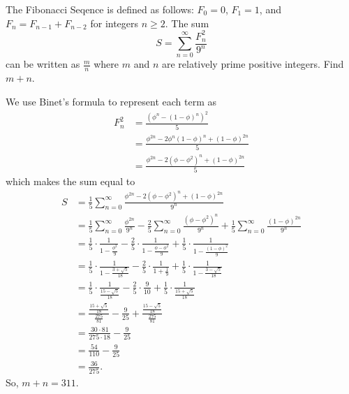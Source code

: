 \documentclass[11pt]{scrartcl}
\begin{document}
\begin{problem}
    The Fibonacci Seqence is defined as follows: $F_{0} = 0$, $F_{1} = 1$, and $F_{n} = F_{n - 1} + F_{n - 2}$ for integers $n \geq 2$. The sum
    \[S = \sum_{n = 0}^{\infty} \frac{F_{n}^{2}}{9^{n}}\]
    can be written as $\frac{m}{n}$ where $m$ and $n$ are relatively prime positive integers. Find $m + n$.
\end{problem}

\begin{soln}
    We use Binet's formula to represent each term as
    \begin{align*}
        F_{n}^{2} &= \frac{(\phi^{n} - (1 - \phi)^{n})^{2}}{5} \\
        &= \frac{\phi^{2n} - 2\phi^{n}(1 - \phi)^{n} + (1 - \phi)^{2n}}{5} \\
        &= \frac{\phi^{2n} - 2(\phi - \phi^{2})^{n} + (1 - \phi)^{2n}}{5}
    \end{align*}
    which makes the sum equal to
    \begin{align*}
        S &= \frac{1}{5}\sum_{n = 0}^{\infty} \frac{\phi^{2n} - 2(\phi - \phi^{2})^{n} + (1 - \phi)^{2n}}{9^{n}} \\
        &= \frac{1}{5}\sum_{n = 0}^{\infty} \frac{\phi^{2n}}{9^{n}} - \frac{2}{5}\sum_{n = 0}^{\infty} \frac{(\phi - \phi^{2})^{n}}{9^{n}} + \frac{1}{5}\sum_{n = 0}^{\infty} \frac{(1 - \phi)^{2n}}{9^{n}} \\
        &= \frac{1}{5} \cdot \frac{1}{1 - \frac{\phi^{2}}{9}} - \frac{2}{5} \cdot \frac{1}{1 - \frac{\phi - \phi^{2}}{9}} + \frac{1}{5} \cdot \frac{1}{1 - \frac{(1 - \phi)^{2}}{9}} \\
        &= \frac{1}{5} \cdot \frac{1}{1 - \frac{3 + \sqrt{5}}{18}} - \frac{2}{5} \cdot \frac{1}{1 + \frac{1}{9}} + \frac{1}{5} \cdot \frac{1}{1 - \frac{3 - \sqrt{5}}{18}} \\
        &= \frac{1}{5} \cdot \frac{1}{\frac{15 - \sqrt{5}}{18}} - \frac{2}{5} \cdot \frac{9}{10} + \frac{1}{5} \cdot \frac{1}{\frac{15 + \sqrt{5}}{18}} \\
        &= \frac{\frac{15 + \sqrt{5}}{18}}{\frac{275}{81}} - \frac{9}{25} + \frac{\frac{15 - \sqrt{5}}{18}}{\frac{275}{81}} \\
        &= \frac{30 \cdot 81}{275 \cdot 18} - \frac{9}{25} \\
        &= \frac{54}{110} - \frac{9}{25} \\
        &= \frac{36}{275}.
    \end{align*}
    So, $m + n = 311$.
\end{soln}
\end{document}
